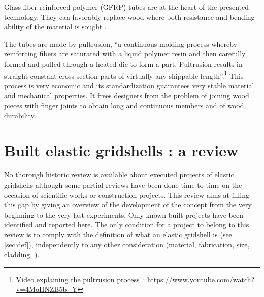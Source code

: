 Glass fiber reinforced polymer (GFRP) tubes are at the heart of the presented technology. They can favorably replace wood where both resistance and bending ability of the material is sought \cite{Douthe2010}. 

The tubes are made by pultrusion, \enquote{a continuous molding process whereby reinforcing fibers are saturated with a liquid polymer resin and then carefully formed and pulled through a heated die to form a part. Pultrusion results in straight constant cross section parts of virtually any shippable length}.\footnote{Video explaining the pultrusion process~: \url{https://www.youtube.com/watch?v=4MoHNZB5b_Y}} This process is very economic and its standardization guarantees very stable material and mechanical properties. It frees designers from the problem of joining wood pieces with finger joints to obtain long and continuous members and of wood durability. 


%
\clearpage



\section{Built elastic gridshells : a review}

No thorough historic review is available about executed projects of elastic gridshells although some partial reviews have been done time to time on the occasion of scientific works or construction projects. This review aims at filling this gap by giving an overview of the development of the concept from the very beginning to the very last experiments. Only known built projects have been identified and reported here. The only condition for a project to belong to this review is to comply with the definition of what an elastic gridshell is (see \cref{sec:def}), independently to any other consideration (material, fabrication, size, cladding, \telp{}).

